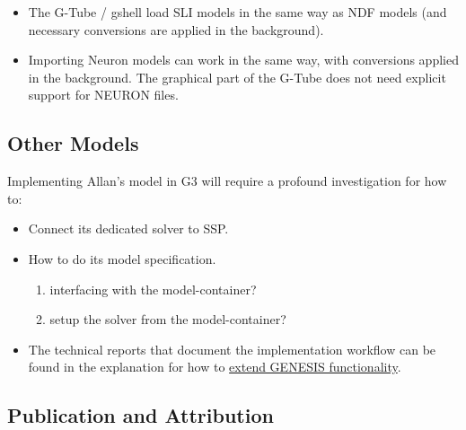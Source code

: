 \documentclass[12pt]{article}
\begin{document}
\begin{itemize}
\item The G-Tube / gshell load SLI models in the same way as NDF
  models (and necessary conversions are applied in the background).
\item Importing Neuron models can work in the same way, with
  conversions applied in the background.  The graphical part of the
  G-Tube does not need explicit support for NEURON files.
\end{itemize}

\subsection{Other Models}

Implementing Allan's model in G3 will require a profound investigation
for how to:
\begin{itemize}
\item Connect its dedicated solver to SSP.
\item How to do its model specification.
  \begin{enumerate}
  \item interfacing with the model-container?
  \item setup the solver from the model-container?
  \end{enumerate}
\item The technical reports that document the implementation workflow
  can be found in the explanation for how to
  \href{../genesis-extend-functionality/genesis-extend-functionality.tex}{extend
    GENESIS functionality}.
\end{itemize}


\subsection{Publication and Attribution}
\end{document}
